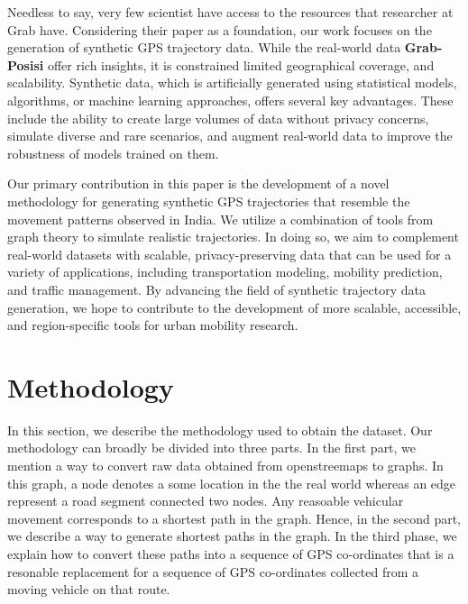 \documentclass[sigplan,screen]{acmart}
\begin{document}
Needless to say, very few scientist have access to the resources
that researcher at Grab have.
Considering their paper as a foundation, our work focuses on the generation of synthetic GPS trajectory data. 
While the real-world data \textbf{Grab-Posisi} offer rich insights, it is
constrained limited geographical coverage, and scalability. 
Synthetic data, which is artificially generated using statistical models, algorithms, or machine learning approaches, offers several key advantages. These include the ability to create large volumes of data without privacy concerns, simulate diverse and rare scenarios, and augment real-world data to improve the robustness of models trained on them.

Our primary contribution in this paper is the development of a novel methodology for generating synthetic GPS trajectories that resemble the movement patterns observed in India. 
We utilize a combination of tools from graph theory to 
simulate realistic trajectories. 
In doing so, we aim to complement real-world datasets with scalable, privacy-preserving data that can be used for a variety of applications, including transportation modeling, mobility prediction, and traffic management.
By advancing the field of synthetic trajectory data generation, we hope to contribute to the development of more scalable, accessible, and region-specific tools for urban mobility research.

\section{Methodology}
In this section, we describe the methodology used to obtain 
the dataset.
Our methodology can broadly be divided into three parts.
In the first part, we mention a way to convert raw data obtained
from \textsf{openstreemaps} to graphs.
In this graph, a node denotes a some location in the 
the real world whereas an edge represent a
 road segment connected two nodes.
Any reasoable vehicular movement corresponds to
a shortest path in the graph. 
Hence, in the second part,
we describe a way to generate shortest paths in the graph.
In the third phase, we explain how to convert these paths 
into a sequence of GPS co-ordinates that is a resonable
replacement for a sequence of  GPS co-ordinates
collected from a moving vehicle on that route.
\end{document}
